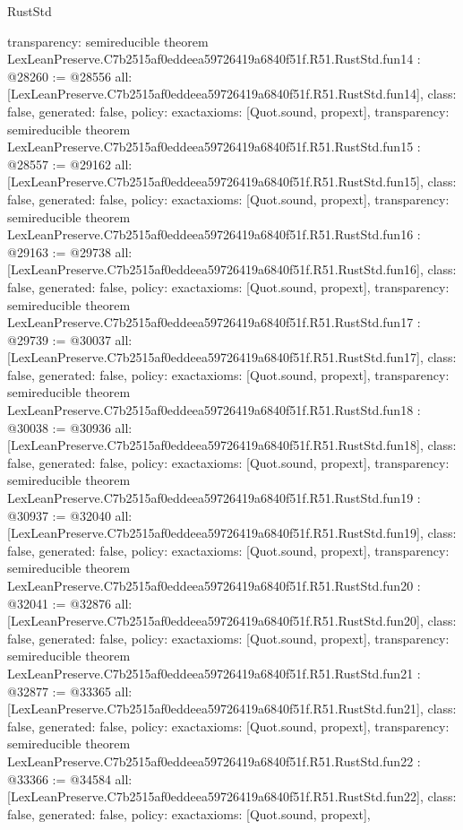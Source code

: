 \begin{lexlean}{RustStd}
\begin{coremodule}
{  transparency: semireducible
}
theorem LexLeanPreserve.C7b2515af0eddeea59726419a6840f51f.R51.RustStd.fun14 : @28260 := @28556 {
  all: [LexLeanPreserve.C7b2515af0eddeea59726419a6840f51f.R51.RustStd.fun14],
  class: false,
  generated: false,
  policy: exact{axioms: [Quot.sound, propext]},
  transparency: semireducible
}
theorem LexLeanPreserve.C7b2515af0eddeea59726419a6840f51f.R51.RustStd.fun15 : @28557 := @29162 {
  all: [LexLeanPreserve.C7b2515af0eddeea59726419a6840f51f.R51.RustStd.fun15],
  class: false,
  generated: false,
  policy: exact{axioms: [Quot.sound, propext]},
  transparency: semireducible
}
theorem LexLeanPreserve.C7b2515af0eddeea59726419a6840f51f.R51.RustStd.fun16 : @29163 := @29738 {
  all: [LexLeanPreserve.C7b2515af0eddeea59726419a6840f51f.R51.RustStd.fun16],
  class: false,
  generated: false,
  policy: exact{axioms: [Quot.sound, propext]},
  transparency: semireducible
}
theorem LexLeanPreserve.C7b2515af0eddeea59726419a6840f51f.R51.RustStd.fun17 : @29739 := @30037 {
  all: [LexLeanPreserve.C7b2515af0eddeea59726419a6840f51f.R51.RustStd.fun17],
  class: false,
  generated: false,
  policy: exact{axioms: [Quot.sound, propext]},
  transparency: semireducible
}
theorem LexLeanPreserve.C7b2515af0eddeea59726419a6840f51f.R51.RustStd.fun18 : @30038 := @30936 {
  all: [LexLeanPreserve.C7b2515af0eddeea59726419a6840f51f.R51.RustStd.fun18],
  class: false,
  generated: false,
  policy: exact{axioms: [Quot.sound, propext]},
  transparency: semireducible
}
theorem LexLeanPreserve.C7b2515af0eddeea59726419a6840f51f.R51.RustStd.fun19 : @30937 := @32040 {
  all: [LexLeanPreserve.C7b2515af0eddeea59726419a6840f51f.R51.RustStd.fun19],
  class: false,
  generated: false,
  policy: exact{axioms: [Quot.sound, propext]},
  transparency: semireducible
}
theorem LexLeanPreserve.C7b2515af0eddeea59726419a6840f51f.R51.RustStd.fun20 : @32041 := @32876 {
  all: [LexLeanPreserve.C7b2515af0eddeea59726419a6840f51f.R51.RustStd.fun20],
  class: false,
  generated: false,
  policy: exact{axioms: [Quot.sound, propext]},
  transparency: semireducible
}
theorem LexLeanPreserve.C7b2515af0eddeea59726419a6840f51f.R51.RustStd.fun21 : @32877 := @33365 {
  all: [LexLeanPreserve.C7b2515af0eddeea59726419a6840f51f.R51.RustStd.fun21],
  class: false,
  generated: false,
  policy: exact{axioms: [Quot.sound, propext]},
  transparency: semireducible
}
theorem LexLeanPreserve.C7b2515af0eddeea59726419a6840f51f.R51.RustStd.fun22 : @33366 := @34584 {
  all: [LexLeanPreserve.C7b2515af0eddeea59726419a6840f51f.R51.RustStd.fun22],
  class: false,
  generated: false,
  policy: exact{axioms: [Quot.sound, propext]},
}
\end{coremodule}
\end{lexlean}
